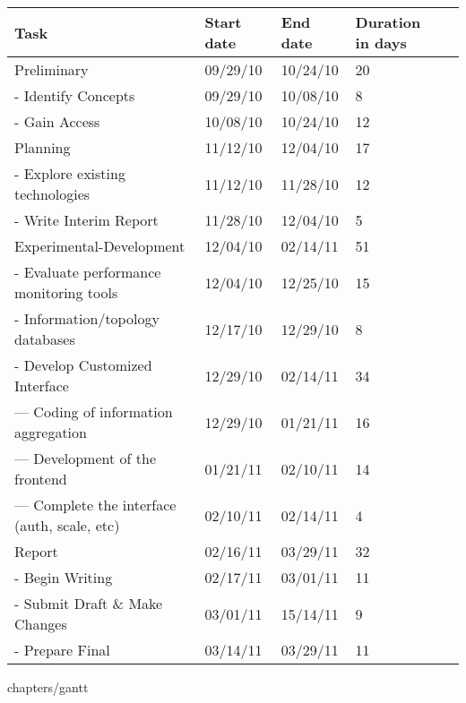 \begin{table}[ht]
\begin{tabular}{ | l | l | l | l | r |}    
\hline
Task & Start date & End date & Duration in days \\ \hline
  Preliminary & 09/29/10 & 10/24/10 & 20 \\ \hline 
  -  Identify Concepts & 09/29/10 & 10/08/10 & 8 \\ \hline 
  -  Gain Access & 10/08/10 & 10/24/10 & 12 \\ \hline 
  Planning & 11/12/10 & 12/04/10 & 17 \\ \hline 
  -  Explore existing technologies & 11/12/10 & 11/28/10 & 12 \\ \hline 
  -  Write Interim Report & 11/28/10 & 12/04/10 & 5 \\ \hline 
  Experimental-Development & 12/04/10 & 02/14/11 & 51 \\ \hline 
  -  Evaluate performance monitoring tools & 12/04/10 & 12/25/10 & 15 \\ \hline 
  -  Information/topology databases & 12/17/10 & 12/29/10 & 8 \\ \hline 
  -  Develop Customized Interface & 12/29/10 & 02/14/11 & 34 \\ \hline 
  ---    Coding of information aggregation & 12/29/10 & 01/21/11 & 16 \\ \hline 
  ---    Development of the frontend & 01/21/11 & 02/10/11 & 14 \\ \hline 
  ---    Complete the interface (auth, scale, etc) & 02/10/11 & 02/14/11 & 4 \\
      \hline Report & 02/16/11 & 03/29/11 & 32 \\ \hline 
  -  Begin Writing & 02/17/11 & 03/01/11 & 11 \\ \hline 
  -  Submit Draft \& Make Changes & 03/01/11 & 15/14/11 & 9 \\ \hline 
  -  Prepare Final & 03/14/11 & 03/29/11 & 11 \\ \hline 
\end{tabular}
\label{tab:tasks}
\end{table}

 {chapters/gantt}

